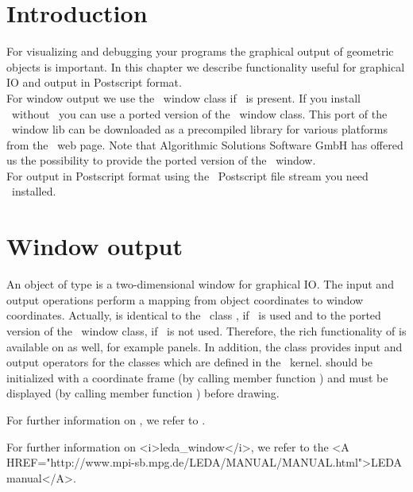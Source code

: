 \ccParDims

\section{Introduction}

For visualizing and debugging your programs the graphical output of geometric 
objects is important. In this chapter we describe functionality useful for 
graphical IO and output in Postscript format.\\
For window output we use the \leda\ window class if \leda\ is present. If you 
install \cgal\ without \leda\ you can use a ported version of the \leda\ window 
class.  This port of the \leda\ window lib can be downloaded as a precompiled 
library for various platforms from the \cgal\ web page. Note that Algorithmic 
Solutions Software GmbH has offered us the possibility to provide the ported 
version of the \leda\ window.\\ For output in Postscript format using the 
\cgal\ Postscript file stream you need \leda\ installed.



\section{Window output}

An object of type  is a two-dimensional window for
graphical IO. The input and output operations perform a mapping from
object coordinates to window coordinates.
Actually,  is identical to the \leda\ class ,
if \leda\ is used and to the ported version of the \leda\ window class, if
\leda\ is not used.
Therefore, the rich functionality of  is available on
 as well, for example panels.
In addition, the class  provides input and output 
operators for the classes which are defined in the \cgal\ kernel.
 should be initialized with a coordinate frame 
(by calling member function
) and must be displayed (by calling member function ) before
drawing.

\begin{ccTexOnly}
For further information on , we refer to \cite{mnsu-lum}.
\end{ccTexOnly}
\begin{ccHtmlOnly}
For further information on <i>leda_window</i>, we refer to the 
<A HREF="http://www.mpi-sb.mpg.de/LEDA/MANUAL/MANUAL.html">LEDA manual</A>.
\end{ccHtmlOnly}

